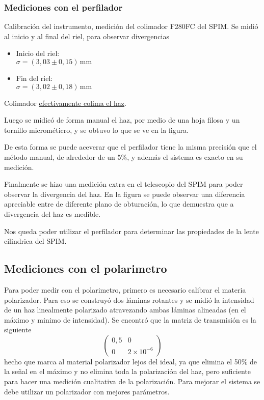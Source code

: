 \subsubsection{Mediciones con el perfilador}

        Calibración del instrumento, medición del colimador F280FC del SPIM. Se midió al inicio y al final del riel, para observar divergencias
        \begin{itemize}
                \item Inicio del riel:\\ $\sigma = (3,03 \pm 0,15)\,\text{mm}$
                \item Fin del riel:\\ $\sigma = (3,02 \pm 0,18)\,\text{mm}$
        \end{itemize}
        Colimador \underline{efectivamente colima el haz}.
        
        Luego se midicó de forma manual el haz, por medio de una hoja filosa y un tornillo microméticro, y se obtuvo lo que se ve en la figura. 
        
        De esta forma se puede aceverar que el perfilador tiene la misma precisión que el método manual, de alrededor de un 5\%, y además el sistema es exacto en su medición.
            
       
       Finalmente se hizo una medición extra en el telescopio del SPIM para poder observar la divergencia del haz. En la figura se puede observar una diferencia apreciable entre de diferente plano de obturación, lo que demuestra que a divergencia del haz es medible. 
       
       Nos queda poder utilizar el perfilador para determinar las propiedades de la lente cilindrica del SPIM.
 

\subsection{Mediciones con el polarimetro}
        Para poder medir con el polarimetro, primero es necesario calibrar el materia polarizador. Para eso se construyó dos láminas rotantes y se midió la intensidad de un haz linealmente polarizado atravezando ambas láminas alineadas (en el máximo y minimo de intensidad).
         Se encontró que la matriz de transmisión es la siguiente
            \begin{equation*}
                \begin{pmatrix} 0,5 & 0 \\ 0 & 2\times 10^{-6} \end{pmatrix}
            \end{equation*}
            hecho que marca al material polarizador lejos del ideal, ya que elimina el 50\% de la señal en el máximo y no elimina toda la polarización del haz, pero suficiente para hacer una medición cualitativa de la polarización. Para mejorar el sistema se debe utilizar un polarizador con mejores parámetros.
            
